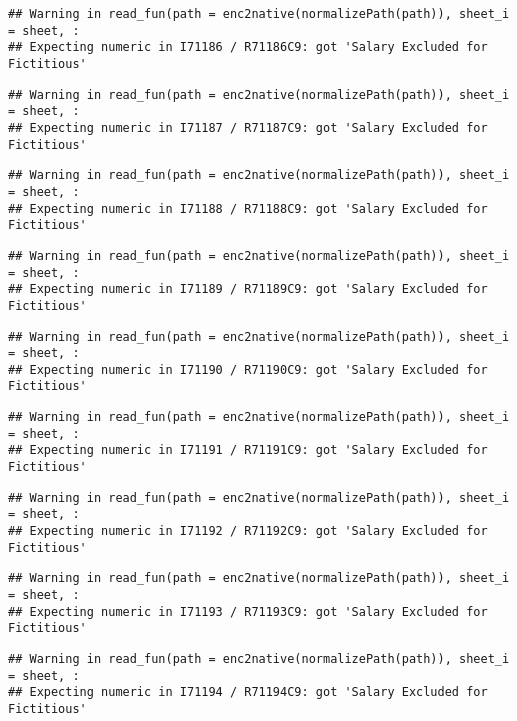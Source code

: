\documentclass[
]{article}
\begin{document}
\begin{verbatim}
## Warning in read_fun(path = enc2native(normalizePath(path)), sheet_i = sheet, :
## Expecting numeric in I71186 / R71186C9: got 'Salary Excluded for Fictitious'
\end{verbatim}

\begin{verbatim}
## Warning in read_fun(path = enc2native(normalizePath(path)), sheet_i = sheet, :
## Expecting numeric in I71187 / R71187C9: got 'Salary Excluded for Fictitious'
\end{verbatim}

\begin{verbatim}
## Warning in read_fun(path = enc2native(normalizePath(path)), sheet_i = sheet, :
## Expecting numeric in I71188 / R71188C9: got 'Salary Excluded for Fictitious'
\end{verbatim}

\begin{verbatim}
## Warning in read_fun(path = enc2native(normalizePath(path)), sheet_i = sheet, :
## Expecting numeric in I71189 / R71189C9: got 'Salary Excluded for Fictitious'
\end{verbatim}

\begin{verbatim}
## Warning in read_fun(path = enc2native(normalizePath(path)), sheet_i = sheet, :
## Expecting numeric in I71190 / R71190C9: got 'Salary Excluded for Fictitious'
\end{verbatim}

\begin{verbatim}
## Warning in read_fun(path = enc2native(normalizePath(path)), sheet_i = sheet, :
## Expecting numeric in I71191 / R71191C9: got 'Salary Excluded for Fictitious'
\end{verbatim}

\begin{verbatim}
## Warning in read_fun(path = enc2native(normalizePath(path)), sheet_i = sheet, :
## Expecting numeric in I71192 / R71192C9: got 'Salary Excluded for Fictitious'
\end{verbatim}

\begin{verbatim}
## Warning in read_fun(path = enc2native(normalizePath(path)), sheet_i = sheet, :
## Expecting numeric in I71193 / R71193C9: got 'Salary Excluded for Fictitious'
\end{verbatim}

\begin{verbatim}
## Warning in read_fun(path = enc2native(normalizePath(path)), sheet_i = sheet, :
## Expecting numeric in I71194 / R71194C9: got 'Salary Excluded for Fictitious'
\end{verbatim}
\end{document}
